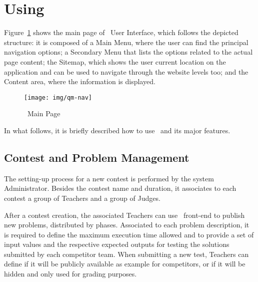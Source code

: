 
\section{Using \quim}\label{s:using}

Figure~\ref{fig:main} shows the main page of \quim\ User Interface, which follows the depicted structure: it is composed of a \textsf{Main Menu}, where the user can find the principal navigation options; a \textsf{Secondary Menu} that lists the options related to the actual page content; the \textsf{Sitemap}, which shows the user current location on the application and can be used to navigate through the website levels too; and the \textsf{Content} area, where the information is displayed.

\begin{figure}[h]
\begin{center} 
\texttt{[image: img/qm-nav]} 
\caption{\quim\ Main Page}\label{fig:main} 
\end{center} 
\end{figure} 

In what follows, it is briefly described how to use \quim\ and its major features.

\subsection{Contest and Problem Management}


The setting-up process for a new contest is performed by the system \textsf{Administrator}. 
Besides the contest name and duration, it associates to each contest a group of \textsf{Teachers} and a group of \textsf{Judges}. %

After a contest creation, the associated \textsf{Teachers} can use \quim\ front-end to publish new problems, distributed by phases. 
Associated to each problem description, it is required to define the maximum execution time allowed and to provide a set of input values and the respective expected outputs for testing the solutions submitted by each competitor team.
When submitting a new test, \textsf{Teachers} can define if it will be publicly available as example for competitors, or if it will be hidden and only used for grading purposes.

